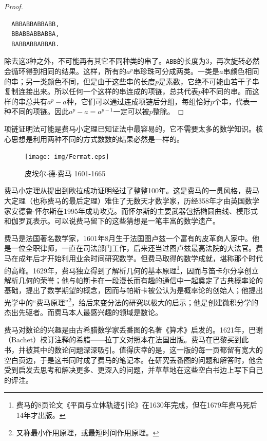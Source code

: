 \documentclass{article}
\begin{document}
\begin{proof}
\begin{verbatim}
  ABBABBABBABB,
  BBABBABBABBA,
  BABBABBABBAB.
\end{verbatim}

除去这3种之外，不可能再有其它不同种类的串了。\texttt{ABB}的长度为3，再次旋转必然会循环得到相同的结果。这样，所有的$a^p$串珍珠可分成两类。一类是$a$串颜色相同的串；另一类颜色不同，但是由于这些串的长度$p$是素数，它绝不可能由若干子串复制连接出来。所以任何一个这样的串连成的项链，总共代表$p$种不同的串。而这样的串总共有$a^p - a$种，它们可以通过连成项链后分组，每组恰好$p$个串，代表一种不同的项链。因此$a^p-a = a^{p-1}$一定可以被$p$整除。
\end{proof}

项链证明法可能是费马小定理已知证法中最容易的，它不需要太多的数学知识。核心思想是利用两种不同的方式数数的结果必然是一样的。

\begin{figure}
  \centering %
 \texttt{[image: img/Fermat.eps]}
 \captionsetup{labelformat=empty}
 \caption{皮埃尔$\cdot$德$\cdot$费马 1601-1665}
 \label{fig:Fermat}
\end{figure}

费马小定理从提出到欧拉成功证明经过了整整100年。这是费马的一贯风格，费马大定理（也称费马的最后定理）难住了无数天才数学家，历经358年才由英国数学家安德鲁$\cdot$怀尔斯在1995年成功攻克。而怀尔斯的主要武器包括椭圆曲线、模形式和伽罗瓦表示\cite{HanXueTao2009}。可以说费马留下的这些猜想是一笔丰富的数学遗产。

\vspace{5mm}

费马是法国著名数学家，1601年8月生于法国图卢兹一个富有的皮革商人家中。他是一位全职律师，一直在司法部门工作，后来还当过图卢兹最高法院的大法官。费马在成年后才开始利用业余时间研究数学。但费马取得的数学成就，堪称那个时代的高峰。1629年，费马独立得到了解析几何的基本原理\footnote{费马的8页论文《平面与立体轨迹引论》在1630年完成，但在1679年费马死后14年才出版。}，因而与笛卡尔分享创立解析几何的荣誉；他与帕斯卡在一段漫长而有趣的通信中一起奠定了古典概率论的基础，提出了数学期望的概念，因而与帕斯卡被公认为是概率论的创始人；他提出光学中的“费马原理”\footnote{又称最小作用原理，或最短时间作用原理。}，给后来变分法的研究以极大的启示；他是创建微积分学的杰出先驱者。而费马本人最感兴趣的领域是数论。

费马对数论的兴趣是由古希腊数学家丢番图的名著《算术》启发的。1621年，巴谢（Bachet）校订注释的希腊——拉丁文对照本在法国出版。费马在巴黎买到此书，并被其中的数论问题深深吸引。值得庆幸的是，这一版的每一页都留有宽大的空白页边，于是这书同时成了费马的笔记本。在研究丢番图的问题和解答时，他会受到启发去思考和解决更多、更深入的问题，并草草地在这些空白书边上写下自己的评注。
\end{document}
